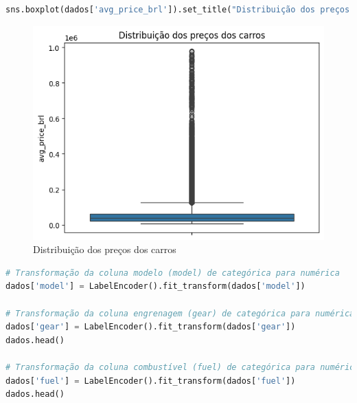 \begin{lstlisting}[language=Python, style=input]
sns.boxplot(dados['avg_price_brl']).set_title("Distribuição dos preços dos carros") 
\end{lstlisting}
\begin{figure}[H]
\centering
\includegraphics[width=.8\linewidth]{apendices/fig/2_IAA002_6.png}
\caption{Distribuição dos preços dos carros}
\end{figure}
\begin{lstlisting}[language=Python, style=input]
# Transformação da coluna modelo (model) de categórica para numérica
dados['model'] = LabelEncoder().fit_transform(dados['model']) 

# Transformação da coluna engrenagem (gear) de categórica para numérica
dados['gear'] = LabelEncoder().fit_transform(dados['gear']) 
dados.head()

# Transformação da coluna combustível (fuel) de categórica para numérica
dados['fuel'] = LabelEncoder().fit_transform(dados['fuel']) 
dados.head()
\end{lstlisting}
\begin{table}[H]
\centering
{}
\label{tab:vehicle_data_encoded}
\end{table}
